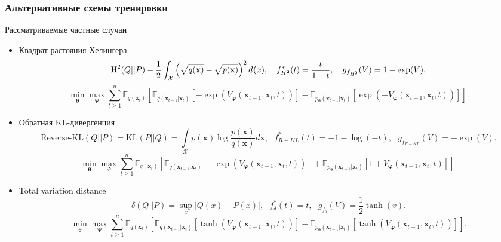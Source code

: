 \documentclass[8pt]{beamer}
\begin{document}
\begin{frame}
	\frametitle{Альтернативные схемы тренировки}
	\begin{block}{Рассматриваемые частные случаи}
		\begin{itemize}
			\item Квадрат растояния Хелингера
				\begin{equation*}
					\text{H}^2(Q||P) - \frac{1}{2}\int_\mathcal{X} \left(\sqrt{q(\textbf{x})} - \sqrt{p(\textbf{x})}\right)^2d\textbf(x), ~~~f^*_{H^2}(t) = \frac{t}{1 - t}, ~~~ g_{f_{H^2}}(V) = 1 - \exp(V).
				\end{equation*}
				 \begin{equation*}
					\min\limits_{\boldsymbol{\theta}}\max\limits_{\boldsymbol{\varphi}}\sum\limits_{t\geqslant 1}^n \mathbb{E}_{q(\textbf{x}_t)}\left[\mathbb{E}_{q(\textbf{x}_{t-1}|\textbf{x}_t)}[- \exp{(V_{\boldsymbol{\varphi}}(\textbf{x}_{t-1}, \textbf{x}_t, t))}] - \mathbb{E}_{p_{\boldsymbol{\theta}}(\textbf{x}_{t-1}|\textbf{x}_t)}[\exp{(-V_{\boldsymbol{\varphi}}(\textbf{x}_{t-1}, \textbf{x}_t, t))}]\right].
				\end{equation*}
			\item Обратная KL-дивергенция
				\begin{equation*}
					\text{Reverse-KL}(Q||P) = \text{KL}(P||Q) = \int\limits_\mathcal{X} p(\textbf{x})\log{\frac{p(\textbf{x})}{q(\textbf{x})}}d\textbf{x}, ~~~ f^*_{R-KL}(t) = -1- \log({-t}),~~~ g_{f_{R-KL}}(V) = - \exp(V).
				\end{equation*}
				\begin{equation*}
					\min\limits_{\boldsymbol{\theta}}\max\limits_{\boldsymbol{\varphi}}\sum\limits_{t\geqslant 1}^n \mathbb{E}_{q(\textbf{x}_t)}\left[\mathbb{E}_{q(\textbf{x}_{t-1}|\textbf{x}_t)}[-\exp{(V_{\boldsymbol{\varphi}}(\textbf{x}_{t-1}, \textbf{x}_t, t))}] + \mathbb{E}_{p_{\boldsymbol{\theta}}(\textbf{x}_{t-1}|\textbf{x}_t)}[1+V_{\boldsymbol{\varphi}}(\textbf{x}_{t-1}, \textbf{x}_t, t)]\right].
				\end{equation*}
			\item Total variation distance
				\begin{equation*}
					\delta (Q||P) = \sup\limits_x|Q(x) - P(x)|,~~~f^*_{\delta}(t) = t, ~~~ g_{f_{\delta}}(V) = \frac{1}{2}\tanh{(v)}.
				\end{equation*}
				\begin{equation*}
					\min\limits_{\boldsymbol{\theta}}\max\limits_{\boldsymbol{\varphi}}\sum\limits_{t\geqslant 1}^n \mathbb{E}_{q(\textbf{x}_t)}\left[\mathbb{E}_{q(\textbf{x}_{t-1}|\textbf{x}_t)}\left[\tanh{(V_{\boldsymbol{\varphi}}(\textbf{x}_{t-1}, \textbf{x}_t, t))}\right] - \mathbb{E}_{p_{\boldsymbol{\theta}}(\textbf{x}_{t-1}|\textbf{x}_t)}\left[\tanh{(V_{\boldsymbol{\varphi}}(\textbf{x}_{t-1}, \textbf{x}_t, t))}\right]\right].
				\end{equation*}	
		\end{itemize}
	\end{block}	
\end{frame}
\end{document}
